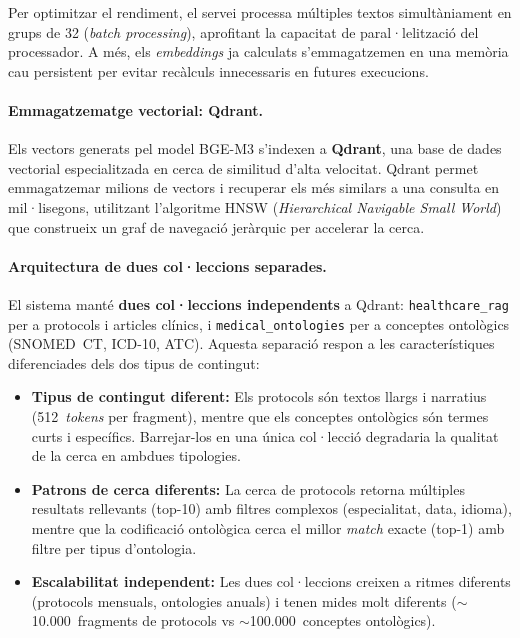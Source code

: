 \documentclass[CAT]{TFUOC}%
\begin{document}
Per optimitzar el rendiment, el servei processa múltiples textos simultàniament en grups de 32 (\textit{batch processing}), aprofitant la capacitat de paral·lelització del processador. A més, els \textit{embeddings} ja calculats s'emmagatzemen en una memòria cau persistent per evitar recàlculs innecessaris en futures execucions.

\paragraph{Emmagatzematge vectorial: Qdrant.}

Els vectors generats pel model BGE-M3 s'indexen a \textbf{Qdrant}, una base de dades vectorial especialitzada en cerca de similitud d'alta velocitat. Qdrant permet emmagatzemar milions de vectors i recuperar els més similars a una consulta en mil·lisegons, utilitzant l'algoritme HNSW (\textit{Hierarchical Navigable Small World}) que construeix un graf de navegació jeràrquic per accelerar la cerca.

\paragraph{Arquitectura de dues col·leccions separades.}

El sistema manté \textbf{dues col·leccions independents} a Qdrant: \texttt{healthcare\_rag} per a protocols i articles clínics, i \texttt{medical\_ontologies} per a conceptes ontològics (SNOMED~CT, ICD-10, ATC). Aquesta separació respon a les característiques diferenciades dels dos tipus de contingut:

\begin{itemize}
    \item \textbf{Tipus de contingut diferent:} Els protocols són textos llargs i narratius (512~\textit{tokens} per fragment), mentre que els conceptes ontològics són termes curts i específics. Barrejar-los en una única col·lecció degradaria la qualitat de la cerca en ambdues tipologies.
    
    \item \textbf{Patrons de cerca diferents:} La cerca de protocols retorna múltiples resultats rellevants (top-10) amb filtres complexos (especialitat, data, idioma), mentre que la codificació ontològica cerca el millor \textit{match} exacte (top-1) amb filtre per tipus d'ontologia.
    
    \item \textbf{Escalabilitat independent:} Les dues col·leccions creixen a ritmes diferents (protocols mensuals, ontologies anuals) i tenen mides molt diferents ($\sim$10.000~fragments de protocols vs $\sim$100.000~conceptes ontològics).
\end{itemize}
\end{document}
